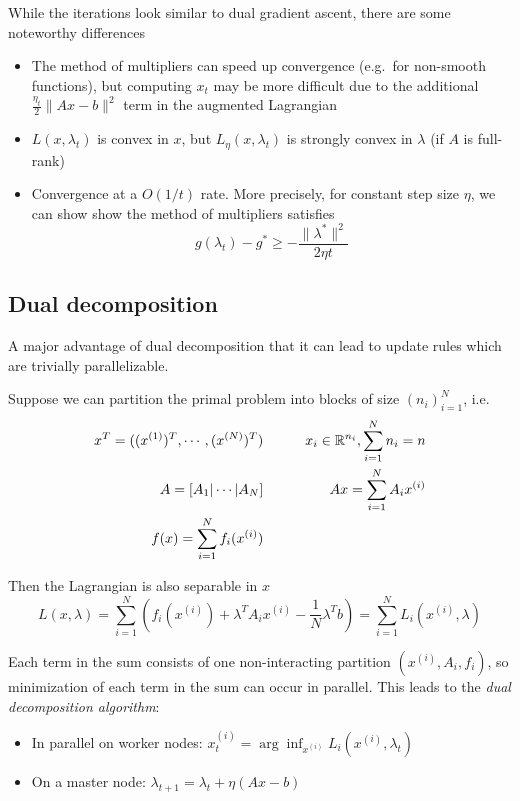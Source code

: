 While the iterations look similar to dual gradient ascent, there are
some noteworthy differences
\begin{itemize}
\item The method of multipliers can speed up
convergence (e.g.~for non-smooth functions), but computing $x_t$ may
be more difficult due to the additional
$\frac{\eta_t}{2} \|A x - b\|^2$ term in the augmented Lagrangian
\item $L(x, \lambda_t)$ is convex in $x$, but $L_\eta(x, \lambda_t)$ is
strongly convex in $\lambda$ (if $A$ is full-rank)
\item Convergence at
a $O(1/t)$ rate. More precisely, for constant step size $\eta$, we
can show show the method of multipliers satisfies
\[g(\lambda_t) - g^* \geq -\frac{\|\lambda^*\|^2}{2\eta t}\]
\end{itemize}

\subsection{Dual decomposition}

A major advantage of dual decomposition that it can lead to update rules
which are trivially parallelizable.

Suppose we can partition the primal problem into blocks of size
$(n_i)_{i=1}^N$, i.e.
\begin{align*}
x ^T = ((x^{(1)})^T, \cdots, (x^{(N)})^T) &\qquad& x_i \in \mathbb{R}^{n_i}, \sum_{i=1}^N n_i = n \\
A = [A_1 \vert \cdots \vert A_N] &\qquad& A x = \sum_{i=1}^N A_i x^{(i)} \\
f(x) = \sum_{i=1}^N f_i(x^{(i)})
\end{align*}

Then the Lagrangian is also separable in $x$
\[
L(x, \lambda) = \sum_{i=1}^N \left( f_i(x^{(i)}) + \lambda^T A_i x^{(i)} - \frac{1}{N} \lambda^T b\right) = \sum_{i=1}^N L_i(x^{(i)}, \lambda)
\]

Each term in the sum consists of one non-interacting partition
$(x^{(i)}, A_i, f_i)$, so minimization of each term in the sum can
occur in parallel. This leads to the \emph{dual decomposition
algorithm}:

\begin{itemize}
\item
  In parallel on worker nodes:
  $x_t^{(i)} = \arg\inf_{x^{(i)}} L_i(x^{(i)}, \lambda_t)$
\item
  On a master node: $\lambda_{t+1} = \lambda_t + \eta (A x - b)$
\end{itemize}

